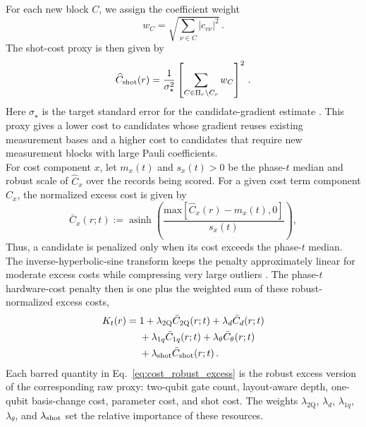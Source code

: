 \documentclass[
  reprint,
  amsmath,
  amssymb,
  aps,
  pra,
  nofootinbib,
  superscriptaddress,
  floatfix
]{revtex4-2}
\newcommand{\twq}{\mathrm{2Q}}
\begin{document}
For each new block \(C\), we assign the coefficient weight
\[
w_C = \sqrt{\sum_{\nu\in C}|c_{r\nu}|^2}\,.
\]
The shot-cost proxy is then given by
\begin{equation*}
\widehat C_{\rm shot}(r)=
\frac{1}{\sigma_\star^2}
\left[
\sum_{C\in\Pi_r\setminus C_r}
w_C
\right]^2\,.
\end{equation*}
%
Here $\sigma_\star$ is the target standard error for the candidate-gradient estimate \cite{Ikhtiarudin2025ShotEfficient}. This proxy gives a lower cost to candidates whose gradient reuses existing measurement bases and a higher cost to candidates that require new measurement blocks with large Pauli coefficients.\\
For cost component \(x\), let \(m_x(t)\) and \(s_x(t)>0\) be the phase-\(t\) median and robust scale of \(\widehat C_x\) over the records being scored. For a given cost term component $\widehat C_x$, the normalized excess cost is given by
%
\begin{equation}
\bar C_x(r;t):=
\operatorname{asinh}
\left(
\frac{\text{max}[\widehat C_x(r)-m_x(t), 0]}{s_x(t)}
\right),
\label{eq:cost_robust_excess}
\end{equation}
%
Thus, a candidate is penalized only when its cost exceeds the phase-\(t\) median. The inverse-hyperbolic-sine transform keeps the penalty approximately linear for moderate excess costs while compressing very large outliers \cite{IglewiczHoaglin1993,Burbidge1988IHS}.
The phase-\(t\) hardware-cost penalty then is one plus the weighted sum of these robust-normalized excess costs,
\begin{equation}
\begin{aligned}
K_t(r)
={}&
1+\lambda_{\twq}\bar C_{\twq}(r;t)
+\lambda_d \bar C_d(r;t)\\
&+\lambda_{1q}\bar C_{1q}(r;t)
 +\lambda_\theta \bar C_\theta(r;t)\\
&+\lambda_{\rm shot}\bar C_{\rm shot}(r;t)\,.
\end{aligned}
\label{eq:hardware_cost_sum}
\end{equation}
%
Each barred quantity in Eq.~\eqref{eq:cost_robust_excess} is the robust excess version of the corresponding raw proxy: two-qubit gate count, layout-aware depth, one-qubit basis-change cost, parameter cost, and shot cost. The weights \(\lambda_{\twq}\), \(\lambda_d\), \(\lambda_{1q}\), \(\lambda_\theta\), and \(\lambda_{\rm shot}\) set the relative importance of these resources.
\end{document}
